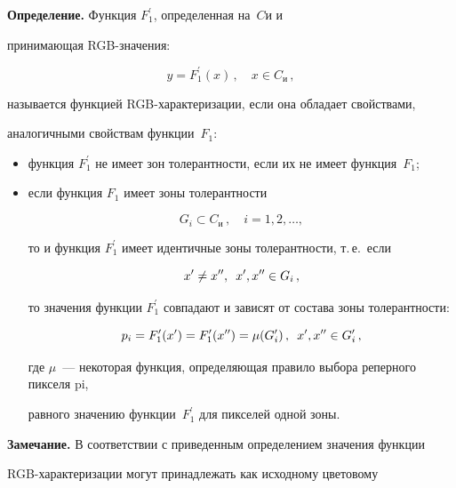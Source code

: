 \noindent


\textbf{Определение.} Функция $F^\prime_1$, определенная на~$C{\mathrm{и}}$ и


при\-ни\-ма\-ющая RGB-зна\-че\-ния:


$$


y=F^\prime_1(x)\,,\quad  x\in C_{\mathrm{и}}\,,


$$


называется функцией RGB-характеризации, если она обладает свойствами,


аналогичными свойствам функции~$F_1$:


\begin{itemize}


\item функция $F^\prime_1$ не имеет зон толерантности, если их не имеет функция~$F_1$;


\item если функция $F_1$ имеет зоны толерантности


$$


G_i \subset C_{\mathrm{и}}\,,\quad  i=1,2,\ldots ,


$$


то и функция $F^{\prime}_1$ имеет идентичные зоны толерантности, т.\,е.\ если


$$


x^\prime\not= x^{\prime\prime},\enskip x^\prime, x^{\prime\prime}\in G_i\,,


$$


то значения функции $F^\prime_1$ совпадают и зависят от состава зоны толерантности:


$$


p_i =F^\prime_1(x^\prime)=F^\prime_1(x^{\prime\prime})=\mu (G^\prime_i)\,,\enskip


x^\prime,x^{\prime\prime}\in G^\prime_i\,,


$$


где $\mu$~--- некоторая функция, определяющая правило выбора реперного пикселя pi,


равного значению функции~$F^\prime_1$ для пикселей одной зоны.


\end{itemize}


\medskip





\noindent


\textbf{Замечание.} В соответствии с приведенным определением значения функции


RGB-характеризации могут принадлежать как исходному цветовому


